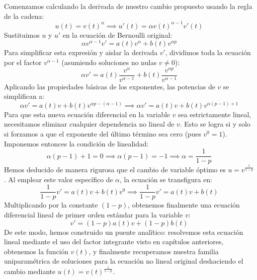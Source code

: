 Comenzamos calculando la derivada de nuestro cambio propuesto usando la regla de la cadena:
\[
    u(t) = v(t)^\alpha \implies u'(t) = \alpha v(t)^{\alpha - 1} v'(t)
\]
Sustituimos $u$ y $u'$ en la ecuación de Bernoulli original:
\[
    \alpha v^{\alpha - 1} v' = a(t) v^\alpha + b(t) v^{\alpha p} 
\]
Para simplificar esta expresión y aislar la derivada $v'$, dividimos toda la ecuación por el factor $v^{\alpha - 1}$ (asumiendo soluciones no nulas $v \neq 0$):
\[
    \alpha v' = a(t) \frac{v^\alpha}{v^{\alpha - 1}} + b(t) \frac{v^{\alpha p}}{v^{\alpha - 1}} 
\]
Aplicando las propiedades básicas de los exponentes, las potencias de $v$ se simplifican a:
\[
    \alpha v' = a(t) v + b(t) v^{\alpha p - (\alpha - 1)} \implies \alpha v' = a(t) v + b(t) v^{\alpha(p-1)+1}
\]
Para que esta nueva ecuación diferencial en la variable $v$ sea estrictamente lineal, necesitamos eliminar cualquier dependencia no lineal de $v$. Esto se logra si y solo si forzamos a que el exponente del último término sea cero (pues $v^0 = 1$). Imponemos entonces la condición de linealidad:
\[
    \alpha(p-1) + 1 = 0 \implies \alpha(p-1) = -1 \implies \alpha = \frac{1}{1-p}
\]
Hemos deducido de manera rigurosa que el cambio de variable óptimo es $u = v^{\frac{1}{1-p}}$. Al emplear este valor específico de $\alpha$, la ecuación se transfigura en:
\[
    \frac{1}{1-p} v' = a(t) v + b(t) v^{0} \implies \frac{1}{1-p} v' = a(t) v + b(t)
\]
Multiplicando por la constante $(1-p)$, obtenemos finalmente una ecuación diferencial lineal de primer orden estándar para la variable $v$:
\[
    v' = (1-p) a(t) v + (1-p) b(t)
\]
De este modo, hemos construido un puente analítico: resolvemos esta ecuación lineal mediante el uso del factor integrante visto en capítulos anteriores, obtenemos la función $v(t)$, y finalmente recuperamos nuestra familia uniparamétrica de soluciones para la ecuación no lineal original deshaciendo el cambio mediante $u(t) = v(t)^{\frac{1}{1-p}}$.

\vspace{0.5cm}


